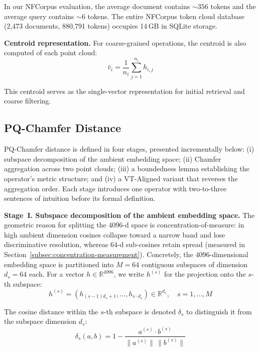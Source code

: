 \documentclass[review,1p]{elsarticle}
\newcommand{\R}{\mathbb{R}}
\newcommand{\bv}{\bar{v}}
\begin{document}
In our NFCorpus evaluation, the average document contains ${\sim}356$ tokens and the average query contains ${\sim}6$ tokens. The entire NFCorpus token cloud database (2{,}473 documents, 880{,}791 tokens) occupies 14\,GB in SQLite storage.

\textbf{Centroid representation.} For coarse-grained operations, the centroid is also computed of each point cloud:
\begin{equation}
\label{eq:centroid}
\bv_i = \frac{1}{n_i} \sum_{j=1}^{n_i} h_{i,j}
\end{equation}

This centroid serves as the single-vector representation for initial retrieval and coarse filtering.

\subsection{PQ-Chamfer Distance}
\label{subsec:pq-chamfer}

PQ-Chamfer distance is defined in four stages, presented incrementally below: (i) subspace decomposition of the ambient embedding space; (ii) Chamfer aggregation across two point clouds; (iii) a boundedness lemma establishing the operator's metric structure; and (iv) a VT-Aligned variant that reverses the aggregation order. Each stage introduces one operator with two-to-three sentences of intuition before its formal definition.

\textbf{Stage~I. Subspace decomposition of the ambient embedding space.} The geometric reason for splitting the $4096$-d space is concentration-of-measure: in high ambient dimension cosines collapse toward a narrow band and lose discriminative resolution, whereas $64$-d sub-cosines retain spread (measured in Section~\ref{subsec:concentration-measurement}). Concretely, the $4096$-dimensional embedding space is partitioned into $M = 64$ contiguous subspaces of dimension $d_s = 64$ each. For a vector $h \in \R^{4096}$, we write $h^{(s)}$ for the projection onto the $s$-th subspace:
\begin{equation}
\label{eq:subspace}
h^{(s)} = (h_{(s-1)d_s+1}, \ldots, h_{s \cdot d_s}) \in \mathbb{R}^{d_s}, \quad s = 1, \ldots, M
\end{equation}

The cosine distance within the $s$-th subspace is denoted $\delta_s$ to distinguish it from the subspace dimension $d_s$:
\begin{equation}
\label{eq:subspace-dist}
\delta_s(a, b) = 1 - \frac{a^{(s)} \cdot b^{(s)}}{\|a^{(s)}\| \, \|b^{(s)}\|}
\end{equation}
\end{document}
